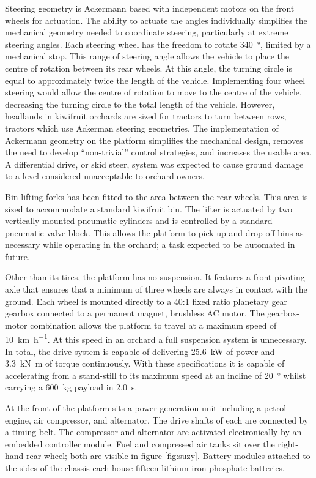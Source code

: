 \documentclass[preprint,authoryear,12pt]{elsarticle}
\begin{document}
    Steering geometry is Ackermann based with independent motors on the front wheels for actuation.
    The ability to actuate the angles individually simplifies the mechanical geometry needed to coordinate steering, particularly at extreme steering angles.
    Each steering wheel has the freedom to rotate \SI{340}{\degree}, limited by a mechanical stop.
    This range of steering angle allows the vehicle to place the centre of rotation between its rear wheels.
    At this angle, the turning circle is equal to approximately twice the length of the vehicle.
    Implementing four wheel steering would allow the centre of rotation to move to the centre of the vehicle, decreasing the turning circle to the total length of the vehicle.
    However, headlands in kiwifruit orchards are sized for tractors to turn between rows, tractors which use Ackerman steering geometries.
    The implementation of Ackermann geometry on the platform simplifies the mechanical design, removes the need to develop ``non-trivial'' control strategies, and increases the usable area.
    A differential drive, or skid steer, system was expected to cause ground damage to a level considered unacceptable to orchard owners.

    Bin lifting forks has been fitted to the area between the rear wheels.
    This area is sized to accommodate a standard kiwifruit bin.
    The lifter is actuated by two vertically mounted pneumatic cylinders and is controlled by a standard pneumatic valve block.
    This allows the platform to pick-up and drop-off bins as necessary while operating in the orchard; a task expected to be automated in future.

    Other than its tires, the platform has no suspension.
    It features a front pivoting axle that ensures that a minimum of three wheels are always in contact with the ground.
    Each wheel is mounted directly to a 40:1 fixed ratio planetary gear gearbox connected to a permanent magnet, brushless AC motor.
    The gearbox-motor combination allows the platform to travel at a maximum speed of \SI{10}{\kilo\meter\per\hour}.
    At this speed in an orchard a full suspension system is unnecessary.
    In total, the drive system is capable of delivering \SI{25.6}{\kilo\watt} of power and \SI{3.3}{\kilo\newton\meter} of torque continuously.
    With these specifications it is capable of accelerating from a stand-still to its maximum speed at an incline of \SI{20}{\degree} whilst carrying a \SI{600}{\kilo\gram} payload in \SI{2.0}{\second}.

    At the front of the platform sits a power generation unit including a petrol engine, air compressor, and alternator.
    The drive shafts of each are connected by a timing belt.
    The compressor and alternator are activated electronically by an embedded controller module.
    Fuel and compressed air tanks sit over the right-hand rear wheel; both are visible in figure \ref{fig:suzy}.
    Battery modules attached to the sides of the chassis each house fifteen lithium-iron-phosphate batteries.
\end{document}
